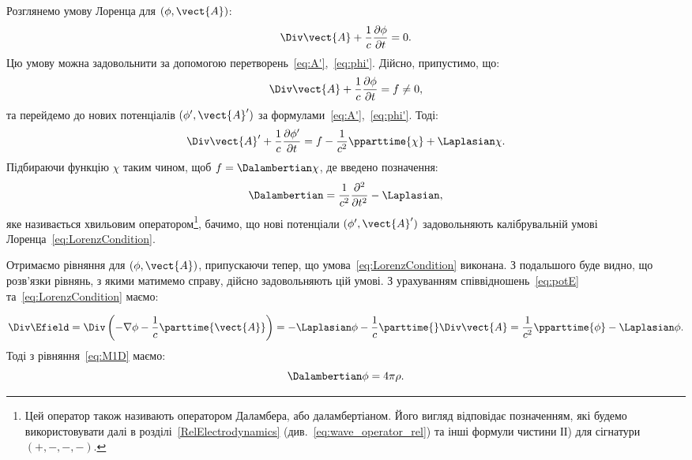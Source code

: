 Розглянемо умову Лоренца для $(\phi, \vect{A})$:
\begin{equation}\label{eq:LorenzCondition}
	\Div \vect{A} + \frac{1}{c} \frac{\partial \phi}{\partial t} = 0.
\end{equation}
Цю умову можна задовольнити за допомогою перетворень~\eqref{eq:A'},~\eqref{eq:phi'}. Дійсно, припустимо, що:
\begin{equation*}
	\Div \vect{A} + \frac{1}{c} \frac{\partial \phi}{\partial t} = f \neq 0,
\end{equation*}
та перейдемо до нових потенціалів $(\phi', \vect{A}')$ за формулами~\eqref{eq:A'},~\eqref{eq:phi'}. Тоді:
\begin{equation*}
	\Div \vect{A}' + \frac{1}{c} \frac{\partial \phi'}{\partial t} =
	f - \frac{1}{c^2} \pparttime{\chi} + \Laplasian\chi.
\end{equation*}
Підбираючи функцію $\chi$ таким чином, щоб $f = \Dalambertian  \chi$, де введено позначення:
\begin{equation}\label{eq:wave_operator}
    \Dalambertian  = \frac{1}{c^2} \frac{\partial^2}{\partial t^2} - \Laplasian,
\end{equation}
яке називається хвильовим оператором\footnote{Цей оператор також називають оператором Даламбера, або даламбертіаном. Його вигляд відповідає позначенням, які будемо використовувати далі в розділі~\ref{RelElectrodynamics} (див.~\eqref{eq:wave_operator_rel}) та інші формули чистини ІІ) для сігнатури $(+, -, -, -)$.}, бачимо, що нові потенціали $(\phi', \vect{A}')$ задовольняють
калібрувальній умові Лоренца~\eqref{eq:LorenzCondition}.

Отримаємо рівняння для $(\phi, \vect{A})$, припускаючи тепер, що умова~\eqref{eq:LorenzCondition} виконана. З подальшого
буде видно, що розв'язки рівнянь, з якими матимемо справу, дійсно задовольняють цій умові. З урахуванням
співвідношень~\eqref{eq:potE} та~\eqref{eq:LorenzCondition} маємо:

\begin{equation*}
	\Div\Efield = \Div\left( -\nabla\phi - \frac1c \parttime{\vect{A}}\right) = - \Laplasian\phi - \frac1c \parttime{}\Div\vect{A} =
	\frac1{c^2}\pparttime{\phi} - \Laplasian\phi.
\end{equation*}
Тоді з рівняння~\eqref{eq:M1D} маємо:
\begin{equation}\label{eq:Dphi}
	\Dalambertian  \phi = 4\pi \rho.
\end{equation}


